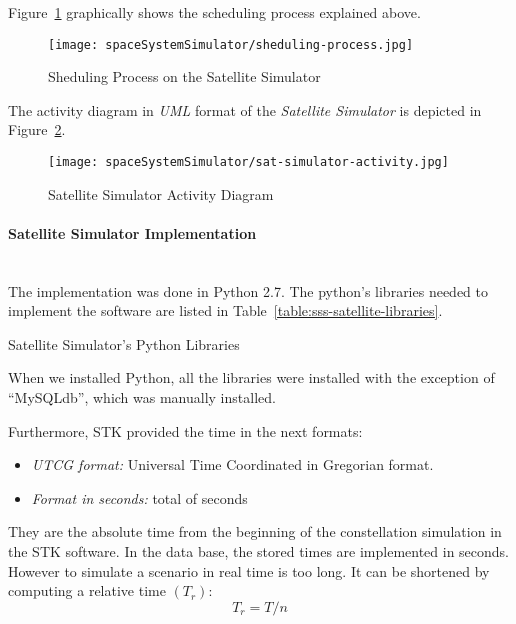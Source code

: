 Figure~\ref{fig:sss-sheduling-process} graphically shows the scheduling process explained above.


\begin{figure}[!h]
\begin{center}
\texttt{[image: spaceSystemSimulator/sheduling-process.jpg]}
\caption{Sheduling Process on the Satellite Simulator}
\label{fig:sss-sheduling-process}
\end{center}
\end{figure}


The activity diagram in \emph{UML} format of the \emph{Satellite Simulator} is
depicted in Figure~\ref{fig:sss-satellite-activity}.

\begin{figure}[!h]
\begin{center}
\texttt{[image: spaceSystemSimulator/sat-simulator-activity.jpg]}
\caption{Satellite Simulator Activity Diagram}
\label{fig:sss-satellite-activity}
\end{center}
\end{figure}

\paragraph{Satellite Simulator Implementation}
\label{par:sat-simulator-implementation}~\\

The implementation was done in Python 2.7. The python's libraries needed to
implement the software are listed in Table~\ref{table:sss-satellite-libraries}.



\begin{table}[h]
  \centering
  {\small
  
  }
  \caption{Satellite Simulator's Python Libraries}
  \label{table:sss-satellite-libraries}
\end{table}

When we installed Python, all the libraries were installed with the exception of ``MySQLdb'', which was manually installed.

Furthermore, STK provided the time in the next formats:
\begin{itemize}
\item \emph{UTCG format:} Universal Time Coordinated in Gregorian format.
\item \emph{Format in seconds:} total of seconds
\end{itemize}
They are the absolute time from the beginning of the constellation simulation in
the STK software. In the data base, the stored times are implemented in
seconds. However to simulate a scenario in real time is too long. It can be
shortened by computing a relative time $(T_r)$:
\begin{equation}\label{eq:TR}
	T_r=T/n
\end{equation}

